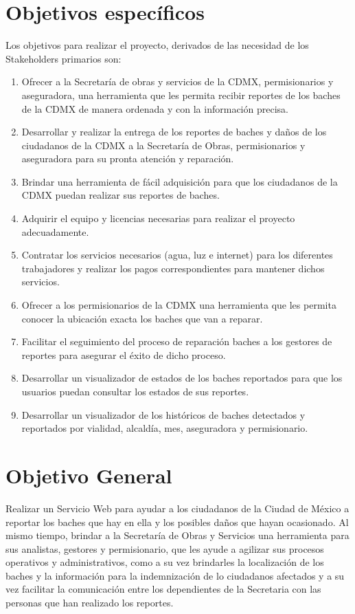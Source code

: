 \chapter{Objetivos específicos}
Los objetivos para realizar el proyecto, derivados de las necesidad de los Stakeholders primarios son:

\begin{enumerate}
     \item Ofrecer a la Secretaría de obras y servicios de la CDMX, permisionarios y aseguradora, una herramienta que les permita recibir reportes de los baches de la CDMX de manera ordenada y con la información precisa.
    \item Desarrollar y realizar la entrega de los reportes de baches y daños de los ciudadanos de la CDMX a la Secretaría de Obras, permisionarios y aseguradora para su pronta atención y reparación.
    \item Brindar una herramienta de fácil adquisición para que los ciudadanos de la CDMX puedan realizar sus reportes de baches.
    \item Adquirir el equipo y licencias necesarias para realizar el proyecto adecuadamente.
    \item Contratar los servicios necesarios (agua, luz e internet) para los diferentes trabajadores y realizar los pagos correspondientes para mantener dichos servicios.
    \item Ofrecer a los permisionarios de la CDMX una herramienta que les permita conocer la ubicación exacta los baches que van a reparar.
    
    \item Facilitar el seguimiento del proceso de reparación baches a los gestores de reportes para asegurar el éxito de dicho proceso.
    \item Desarrollar un visualizador de estados de los baches reportados para que los usuarios puedan consultar los estados de sus reportes.
    \item Desarrollar un visualizador de los históricos de baches detectados y reportados por vialidad, alcaldía, mes, aseguradora y permisionario.
\end{enumerate}

\chapter{Objetivo General}
Realizar un Servicio Web para ayudar a los ciudadanos de la Ciudad de México a reportar los baches que hay en ella y los posibles daños que hayan ocasionado. Al mismo tiempo, brindar a  la Secretaría de Obras y Servicios una herramienta para sus analistas, gestores y permisionario, que les ayude a agilizar sus procesos operativos y administrativos, como a su vez brindarles la localización de los baches y la información para la indemnización de lo ciudadanos afectados y a su vez facilitar la comunicación entre los dependientes de la Secretaria con las personas que han realizado los reportes.

